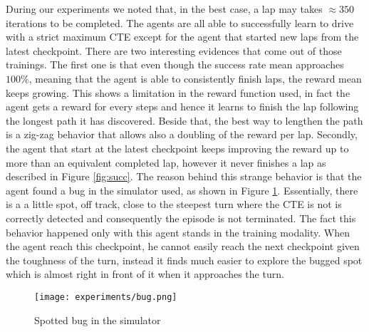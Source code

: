 During our experiments we noted that, in the best case, a lap may takes $\approx 350$ iterations to be completed. The agents are all able to successfully learn to drive with a strict maximum CTE except for the agent that started new laps from the latest checkpoint. There are two interesting evidences that come out of those trainings. The first one is that even though the success rate mean approaches $100\%$, meaning that the agent is able to consistently finish laps, the reward mean keeps growing. This shows a limitation in the reward function used, in fact the agent gets a reward for every steps and hence it learns to finish the lap following the longest path it has discovered. Beside that, the best way to lengthen the path is a zig-zag behavior that allows also a doubling of the reward per lap. Secondly, the agent that start at the latest checkpoint keeps improving the reward up to more than an equivalent completed lap, however it never finishes a lap as described in Figure \ref{fig:succ}. The reason behind this strange behavior is that the agent found a bug in the simulator used, as shown in Figure \ref{fig:bug}. Essentially, there is a a little spot, off track, close to the steepest turn where the CTE is not is correctly detected and consequently the episode is not terminated. The fact this behavior happened only with this agent stands in the training modality. When the agent reach this checkpoint, he cannot easily reach the next checkpoint given the toughness of the turn, instead it finds much easier to explore the bugged spot which is almost right in front of it when it approaches the turn.

\begin{figure}[h]
  \begin{center}
    \texttt{[image: experiments/bug.png]}
  \end{center}
  \caption{Spotted bug in the simulator}
  \label{fig:bug}
\end{figure}

